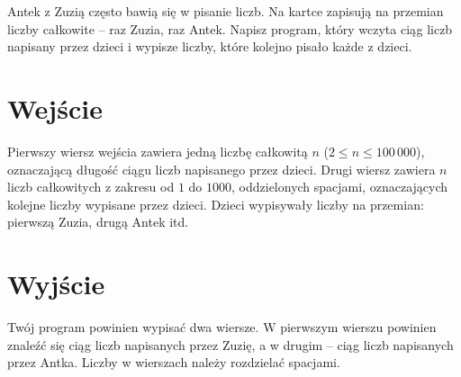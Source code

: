 \documentclass{spiral-kurs}
\begin{document}
\makeheader
%
Antek z Zuzią często bawią się w pisanie liczb.
Na kartce zapisują na przemian liczby całkowite -- raz Zuzia, raz Antek.
Napisz program, który wczyta ciąg liczb napisany przez dzieci i wypisze liczby,
które kolejno pisało każde z dzieci.

\section{Wejście}
Pierwszy wiersz wejścia zawiera jedną liczbę całkowitą $n$ ($2 \le n \le 100\,000$), oznaczającą długość ciągu
liczb napisanego przez dzieci.
Drugi wiersz zawiera $n$ liczb całkowitych z zakresu od $1$ do $1000$, oddzielonych spacjami,
oznaczających kolejne liczby wypisane przez dzieci.
Dzieci wypisywały liczby na przemian: pierwszą Zuzia, drugą Antek itd.

\section{Wyjście}
Twój program powinien wypisać dwa wiersze.
W pierwszym wierszu powinien znaleźć się ciąg liczb napisanych przez Zuzię,
a w drugim -- ciąg liczb napisanych przez Antka.
Liczby w wierszach należy rozdzielać spacjami.



  
\end{document}
